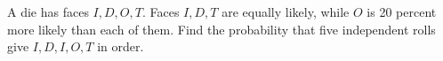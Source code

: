 A die has faces $I,D,O,T$. Faces $I,D,T$ are equally likely, while $O$ is 20 percent more likely than each of them. Find the probability that five independent rolls give $I,D,I,O,T$ in order.
